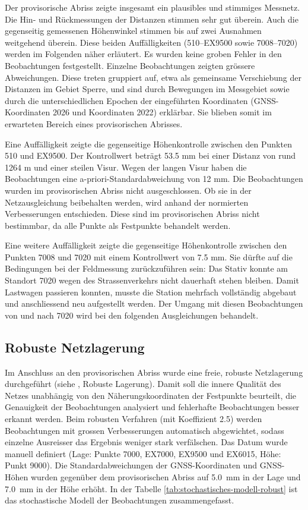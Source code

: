 Der provisorische Abriss zeigte insgesamt ein plausibles und stimmiges
Messnetz. Die Hin- und Rückmessungen der Distanzen stimmen sehr gut überein.
Auch die gegenseitig gemessenen Höhenwinkel stimmen bis auf zwei Ausnahmen
weitgehend überein. Diese beiden Auffälligkeiten (510–EX9500 sowie 7008–7020)
werden im Folgenden näher erläutert. Es wurden keine
groben Fehler in den Beobachtungen festgestellt. Einzelne Beobachtungen
zeigten grössere Abweichungen. Diese treten gruppiert auf, etwa als
gemeinsame Verschiebung der Distanzen im Gebiet Sperre, und sind durch
Bewegungen im Messgebiet sowie durch die unterschiedlichen Epochen der
eingeführten Koordinaten (GNSS-Koordinaten 2026 und Koordinaten 2022)
erklärbar. Sie blieben somit im erwarteten Bereich eines provisorischen
Abrisses. \bigskip

Eine Auffälligkeit zeigte die gegenseitige Höhenkontrolle zwischen den
Punkten 510 und EX9500. Der Kontrollwert beträgt 53.5 mm bei einer Distanz
von rund 1264 m und einer steilen Visur. Wegen der langen Visur haben die
Beobachtungen eine a-priori-Standardabweichung von 12 mm. Die Beobachtungen wurden im
provisorischen Abriss nicht ausgeschlossen. Ob sie in der Netzausgleichung
beibehalten werden, wird anhand der normierten Verbesserungen entschieden.
Diese sind im provisorischen Abriss nicht bestimmbar, da alle Punkte als Festpunkte
behandelt werden. \bigskip

Eine weitere Auffälligkeit zeigte die gegenseitige Höhenkontrolle zwischen den Punkten
7008 und 7020 mit einem Kontrollwert von 7.5 mm. Sie dürfte auf die
Bedingungen bei der Feldmessung zurückzuführen sein: Das Stativ konnte am
Standort 7020 wegen des Strassenverkehrs nicht dauerhaft stehen bleiben.
Damit Lastwagen passieren konnten, musste die Station mehrfach vollständig
abgebaut und anschliessend neu aufgestellt werden. Der Umgang mit diesen
Beobachtungen von und nach 7020 wird bei den folgenden Ausgleichungen behandelt.

\subsection{Robuste Netzlagerung}
\label{sec:robuste netzlagerung}
Im Anschluss an den provisorischen Abriss wurde eine freie, robuste
Netzlagerung durchgeführt (siehe , Robuste Lagerung). Damit soll die
innere Qualität des Netzes unabhängig von den Näherungskoordinaten der
Festpunkte beurteilt, die Genauigkeit der Beobachtungen analysiert und
fehlerhafte Beobachtungen besser erkannt werden. Beim robusten Verfahren 
(mit Koeffizient 2.5) werden Beobachtungen mit grossen Verbesserungen
automatisch abgewichtet, sodass einzelne Ausreisser das Ergebnis weniger
stark verfälschen. Das Datum wurde manuell definiert
(Lage: Punkte 7000, EX7000, EX9500 und EX6015, Höhe: Punkt 9000). Die
Standardabweichungen der GNSS-Koordinaten und GNSS-Höhen wurden gegenüber
dem provisorischen Abriss auf 5.0~mm in der Lage und 7.0~mm in der Höhe erhöht.
In der Tabelle \ref{tab:stochastisches-modell-robust} ist das stochastische Modell der Beobachtungen zusammengefasst.

